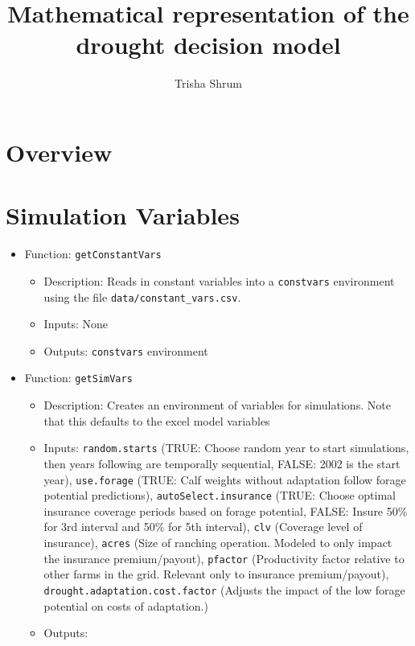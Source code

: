 \documentclass[11pt]{article}
\title{Mathematical representation of the drought decision model}
\author{Trisha Shrum}
\begin{document}
\maketitle

\section{Overview}


\section{Simulation Variables}
\begin{itemize}
\item Function: \verb!getConstantVars!
	\begin{itemize}
	\item Description: Reads in constant variables into a \verb!constvars! environment using the file \verb!data/constant_vars.csv!.
	\item Inputs: None
	\item Outputs: \verb!constvars! environment
	\end{itemize}
\end{itemize}

\begin{itemize}
\item Function: \verb!getSimVars!
	\begin{itemize}
	\item Description: Creates an environment of variables for simulations. Note that this defaults to the excel model variables 
	\item Inputs: \verb!random.starts! (TRUE: Choose random year to start simulations, then years following are temporally sequential, FALSE: 2002 is the start year), \verb!use.forage! (TRUE: Calf weights without adaptation follow forage potential predictions), \verb!autoSelect.insurance! (TRUE: Choose optimal insurance coverage periods based on forage potential, FALSE: Insure 50\% for 3rd interval and 50\% for 5th interval), \verb!clv! (Coverage level of insurance), \verb!acres! (Size of ranching operation. Modeled to only impact the insurance premium/payout), \verb!pfactor! (Productivity factor relative to other farms in the grid. Relevant only to insurance premium/payout), \verb!drought.adaptation.cost.factor! (Adjusts the impact of the low forage potential on costs of adaptation.)
	\item Outputs: 
	\end{itemize}
\end{itemize}
\end{document}
